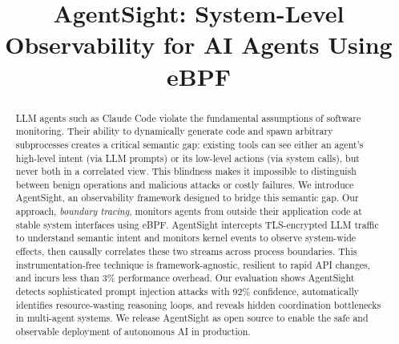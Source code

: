 \documentclass[sigplan,screen,review,9pt]{acmart}
\begin{document}
\title{AgentSight: System-Level Observability for AI Agents Using eBPF}


\author{}


\sloppy
\begin{abstract}
    LLM agents such as Claude Code violate the fundamental assumptions of software monitoring. Their ability to dynamically generate code and spawn arbitrary subprocesses creates a critical semantic gap: existing tools can see either an agent's high-level intent (via LLM prompts) or its low-level actions (via system calls), but never both in a correlated view. This blindness makes it impossible to distinguish between benign operations and malicious attacks or costly failures. We introduce AgentSight, an observability framework designed to bridge this semantic gap. Our approach, \emph{boundary tracing}, monitors agents from outside their application code at stable system interfaces using eBPF. AgentSight intercepts TLS-encrypted LLM traffic to understand semantic intent and monitors kernel events to observe system-wide effects, then causally correlates these two streams across process boundaries. This instrumentation-free technique is framework-agnostic, resilient to rapid API changes, and incurs less than 3\% performance overhead. Our evaluation shows AgentSight detects sophisticated prompt injection attacks with 92\% confidence, automatically identifies resource-wasting reasoning loops, and reveals hidden coordination bottlenecks in multi-agent systems. We release AgentSight as open source to enable the safe and observable deployment of autonomous AI in production.
\end{abstract}


\maketitle










\end{document}
